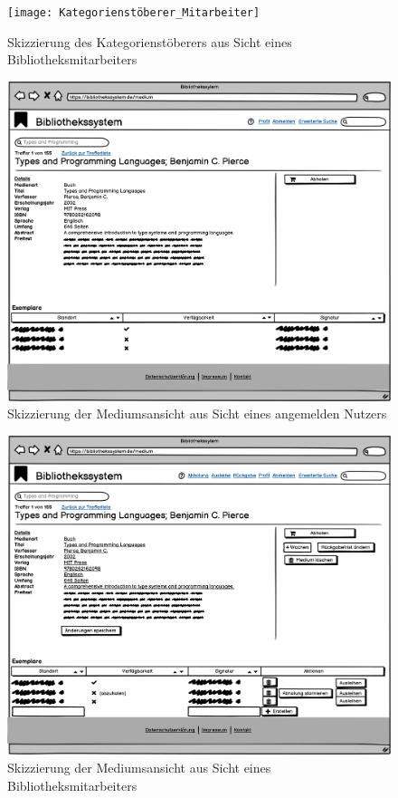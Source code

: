 \documentclass{article}
\begin{document}
\begin{figure}[h]
    \centering
    \texttt{[image: Kategorienstöberer\_Mitarbeiter]}
    \caption{Skizzierung des Kategorienstöberers aus Sicht eines Bibliotheksmitarbeiters}
    \label{katstoebmit}
\end{figure}

\begin{figure}[h]
    \centering
    \includegraphics[width = 40em]{Mediumsansicht}
    \caption{Skizzierung der Mediumsansicht aus Sicht eines angemelden Nutzers}
    \label{mediumsansicht}
\end{figure}

\begin{figure}[h]
    \centering
    \includegraphics[width = 40em]{Mediumsansicht_Mitarbeiter}
    \caption{Skizzierung der Mediumsansicht aus Sicht eines Bibliotheksmitarbeiters}
    \label{mediumsansichtmit}
\end{figure}
\end{document}
